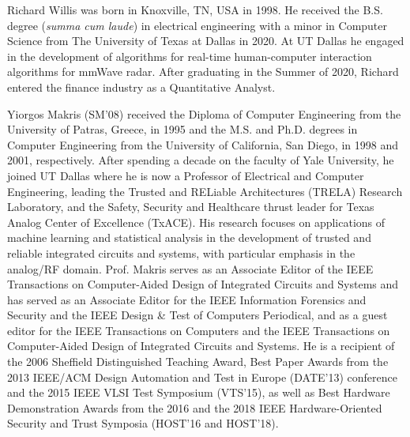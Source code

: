\documentclass{ieeeaccess}
\begin{document}
\begin{IEEEbiography}{Richard Willis} was born in Knoxville, TN, USA in 1998. He received the B.S. degree (\textit{summa cum laude}) in electrical engineering with a minor in Computer Science from The University of Texas at Dallas in 2020. At UT Dallas he engaged in the development of algorithms for real-time human-computer interaction algorithms for mmWave radar. After graduating in the Summer of 2020, Richard entered the finance industry as a Quantitative Analyst.
\end{IEEEbiography}

\begin{IEEEbiography}{Yiorgos Makris} (SM'08) received the Diploma of Computer Engineering from the University of Patras, Greece, in 1995 and the M.S. and Ph.D. degrees in Computer Engineering from the University of California, San Diego, in 1998 and 2001, respectively. After spending a decade on the faculty of Yale University, he joined UT Dallas where he is now a Professor of Electrical and Computer Engineering, leading the Trusted and RELiable Architectures (TRELA) Research Laboratory, and the Safety, Security and Healthcare thrust leader for Texas Analog Center of Excellence (TxACE). His research focuses on applications of machine learning and statistical analysis in the development of trusted and reliable integrated circuits and systems, with particular emphasis in the analog/RF domain. Prof. Makris serves as an Associate Editor of the IEEE Transactions on Computer-Aided Design of Integrated Circuits and Systems and has served as an Associate Editor for the IEEE Information Forensics and Security and the IEEE Design \& Test of Computers Periodical, and as a guest editor for the IEEE Transactions on Computers and the IEEE Transactions on Computer-Aided Design of Integrated Circuits and Systems. He is a recipient of the 2006 Sheffield Distinguished Teaching Award, Best Paper Awards from the 2013 IEEE/ACM Design Automation and Test in Europe (DATE'13) conference and the 2015 IEEE VLSI Test Symposium (VTS'15), as well as Best Hardware Demonstration Awards from the 2016 and the 2018 IEEE Hardware-Oriented Security and Trust Symposia (HOST'16 and HOST'18).
\end{IEEEbiography}
\end{document}
